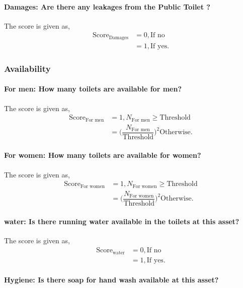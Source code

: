 \documentclass[oneside,twocolumn]{article}
\newcommand{\tsub}[2]{\text{#1}_{\text{#2}}}
\newcommand{\tsubb}[2]{#1_{\text{#2}}}
\begin{document}
\paragraph{Damages: Are there any leakages from the Public Toilet ? 
}

The score is given as,
\begin{align*}
\tsub{Score}{Damages} &= 0, \text{If no} \\
        &= 1, \text{If yes}.
\end{align*}
\subsubsection{Availability}

\paragraph{For men: How many toilets are available for men?}

The score is given as,
\begin{align*}
\tsub{Score}{For men} &= 1, \tsubb{N}{For men} \ge \text{Threshold} \\
        &=
\Big(\dfrac{\tsubb{N}{For men}}{\text{Threshold}}\Big)^{2}
\text{Otherwise}.
\end{align*}
\paragraph{For women: How many toilets are available for women?}

The score is given as,
\begin{align*}
\tsub{Score}{For women} &= 1, \tsubb{N}{For women} \ge \text{Threshold} \\
        &=
\Big(\dfrac{\tsubb{N}{For women}}{\text{Threshold}}\Big)^{2}
\text{Otherwise}.
\end{align*}
\paragraph{water: Is there running water available in the toilets at this asset?}

The score is given as,
\begin{align*}
\tsub{Score}{water} &= 0, \text{If no} \\
        &= 1, \text{If yes}.
\end{align*}
\paragraph{Hygiene: Is there soap for hand wash available at this asset?}
\end{document}
